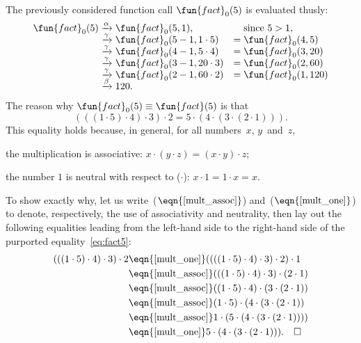 The previously considered function call \(\fun{fact}_0(5)\) is
evaluated thusly:
\begin{equation*}
\begin{array}{r@{\;}c@{\;}lc@{\;}l}
\fun{fact}_0(5)
& \xrightarrow{\smash[t]{\alpha}} & \fun{fact}_0(5,1),
&& \text{since \(5 > 1\)},\\
& \xrightarrow{\smash[t]{\gamma}} & \fun{fact}_0(5-1,1 \cdot 5)
& = & \fun{fact}_0(4,5)\\
& \xrightarrow{\smash[t]{\gamma}} & \fun{fact}_0(4-1,5 \cdot 4)
& = & \fun{fact}_0(3,20)\\
& \xrightarrow{\smash[t]{\gamma}} & \fun{fact}_0(3-1,20 \cdot 3)
& = & \fun{fact}_0(2,60)\\
& \xrightarrow{\smash[t]{\gamma}} & \fun{fact}_0(2-1,60 \cdot 2)
& = & \fun{fact}_0(1,120)\\
& \xrightarrow{\smash[t]{\beta}} & 120.
\end{array}
\end{equation*}
The reason why \(\fun{fact}_0(5) \equiv \fun{fact}(5)\) is that
\begin{equation}
  (((1 \cdot 5) \cdot 4) \cdot 3) \cdot 2
= 5 \cdot (4 \cdot (3 \cdot (2 \cdot 1))).\label{eq:fact5}
\end{equation}
This equality holds because, in general, for all numbers~\(x\),
\(y\)~and~\(z\),
\begin{enumerate*}

\item \label{mult_assoc} the multiplication is associative: \(x \cdot
  (y \cdot z) = (x \cdot y) \cdot z\);

\item \label{mult_one} the number \(1\) is neutral with respect to
  (\(\cdot\)): \(x \cdot 1 = 1 \cdot x = x\).

\end{enumerate*}
To show exactly why, let us write~(\(\eqn{\ref{mult_assoc}}\))
and~(\(\eqn{\ref{mult_one}}\)) to denote, respectively, the use of
associativity and neutrality, then lay out the following equalities
leading from the left\hyp{}hand side to the right\hyp{}hand side of
the purported equality~\eqref{eq:fact5}:
\begin{align*}
  (((1 \cdot 5) \cdot 4) \cdot 3) \cdot 2
  &\eqn{\smash{\ref{mult_one}}} ((((1 \cdot 5) \cdot 4) \cdot 3) \cdot
  2) \cdot 1\\
  &\eqn{\smash{\ref{mult_assoc}}} (((1 \cdot 5) \cdot 4) \cdot 3)
  \cdot (2 \cdot 1)\\
  &\eqn{\smash{\ref{mult_assoc}}} ((1 \cdot 5) \cdot 4) \cdot (3 \cdot (2
    \cdot 1))\\
  &\eqn{\smash{\ref{mult_assoc}}} (1 \cdot 5) \cdot (4 \cdot (3 \cdot
  (2 \cdot 1))\\
  &\eqn{\smash{\ref{mult_assoc}}} 1 \cdot (5 \cdot (4 \cdot (3 \cdot
  (2 \cdot 1))))\\
  &\eqn{\smash{\ref{mult_one}}} 5 \cdot (4 \cdot (3 \cdot (2 \cdot
  1))).\quad \Box
\end{align*}
